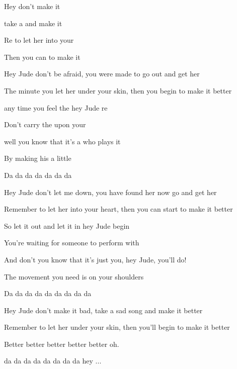 

\zs
Hey  don't make it 

take a  and make it 

Re to let her into your 

Then you can  to make it 
\ks

\zs
Hey Jude don't be afraid,
you were made to go out and get her

The minute you let her under your skin,
then you begin to make it better
\ks

\zr
{} any time you feel the  hey {Jude} re

Don't {carry} the  {upon} your 

 well you know that it's a  who {plays} it 

By {making} his  a {little} 

Da da da  da da da  da
\kr

\zs
Hey Jude don't let me down,
you have found her now go and get her

Remember to let her into your heart,
then you can start to make it better
\ks

\zr
So let it out and let it in hey Jude begin

You're waiting for someone to perform with

And don't you know that it's just you, hey Jude, you'll do!

The movement you need is on your shoulders

Da da da da da da da da da
\kr

\zs
Hey Jude don't make it bad,
take a sad song and make it better

Remember to let her under your skin,
then you'll begin to make it better

Better better better better better oh.
\ks

 da da  da da da  da da da hey  ...

\kp





